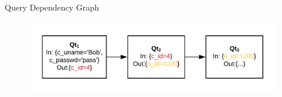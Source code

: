 \documentclass[10pt]{beamer}
\begin{document}
\begin{frame}[fragile]{Query Dependency Graph}
    \begin{figure}
        \includegraphics[scale=0.22]{apollo_query_pipeline}
    \end{figure}
\end{frame}

\end{document}
